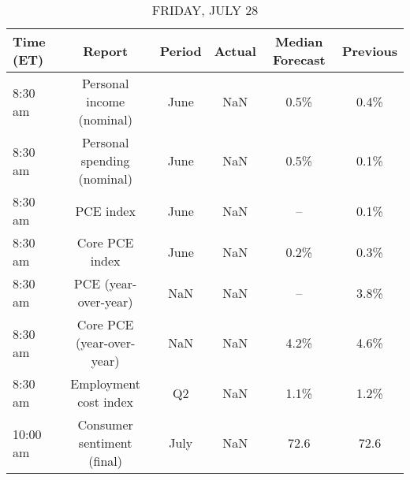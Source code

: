 \documentclass{article}%
\begin{document}
\begin{table}[htbp]%
\caption{FRIDAY, JULY 28}%
\centering%
\begin{adjustbox}{width=1\textwidth}%
\begin{tabular}{lccccc}
\toprule
Time (ET) &                      Report & Period & Actual & Median Forecast & Previous \\
\midrule
  8:30 am &   Personal income (nominal) &   June &    NaN &            0.5\% &     0.4\% \\
  8:30 am & Personal spending (nominal) &   June &    NaN &            0.5\% &     0.1\% \\
  8:30 am &                   PCE index &   June &    NaN &              -- &     0.1\% \\
  8:30 am &              Core PCE index &   June &    NaN &            0.2\% &     0.3\% \\
  8:30 am &        PCE (year-over-year) &    NaN &    NaN &              -- &     3.8\% \\
  8:30 am &   Core PCE (year-over-year) &    NaN &    NaN &            4.2\% &     4.6\% \\
  8:30 am &       Employment cost index &     Q2 &    NaN &            1.1\% &     1.2\% \\
 10:00 am &  Consumer sentiment (final) &   July &    NaN &            72.6 &     72.6 \\
\bottomrule
\end{tabular}
%
\end{adjustbox}%
\end{table}
\end{document}
